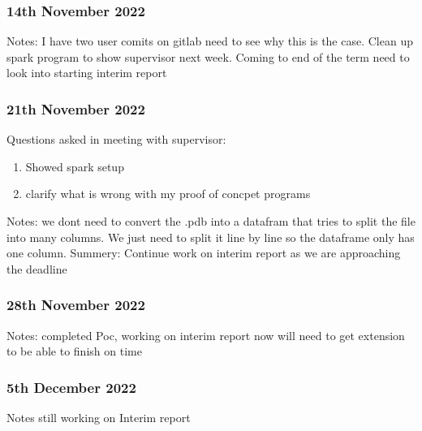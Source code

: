 \documentclass{report}
\begin{document}
\subsubsection{14th November 2022}
Notes: I have two user comits on gitlab need to see why this is the case. Clean up spark program to show supervisor next week. Coming to end of the term need to look into starting interim report

\subsubsection{21th November 2022}
Questions asked in meeting with supervisor: 
\begin{enumerate}
    \item Showed spark setup
    \item clarify what is wrong with my proof of concpet programs
\end{enumerate}
Notes: we dont need to convert the .pdb into a datafram that tries to split the file into many columns. We just need to split it line by line so the dataframe only has one column.
Summery: Continue work on interim report as we are approaching the deadline
\subsubsection{28th November 2022}
Notes: completed Poc, working on interim report now will need to get extension to be able to finish on time
\subsubsection{5th December 2022}
Notes still working on Interim report


\end{document}
